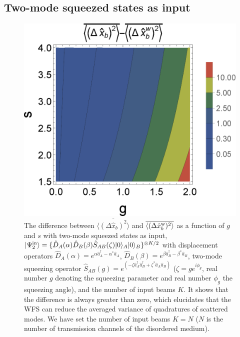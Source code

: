 \documentclass[9pt,twocolumn,twoside]{osajnl}
\begin{document}
\subsection{Two-mode squeezed states as input}

\begin{figure}[htb]
\begin{center}
\includegraphics[width=.40\textwidth]{3Dsqz2_20190708.eps} {}
\end{center}
\caption{The difference between $\overline{\langle (\Delta \hat{x}_b)^2 \rangle}$ and $\overline{\langle (\Delta \hat{x}_b^{\rm{w}})^2 \rangle}$ as a function of $g$ and $s$ with two-mode squeezed states as input, $| \Psi_2^{\rm{in}} \rangle = \{\hat{D}_{A}(\alpha)  \hat{D}_{B}(\beta) \hat{S}_{AB}(\zeta) |0\rangle_A |0\rangle_B \}^{\otimes K/2}$ with displacement operators $\hat{D}_A(\alpha) = e^{\alpha \hat{a}_A^{\dagger} - \alpha^{\ast} \hat{a}_A}$, $\hat{D}_B(\beta) = e^{\beta \hat{a}_B^{\dagger} - \beta^{\ast} \hat{a}_B}$, two-mode squeezing operator $\hat{S}_{AB}(g) = e^{(-\zeta\hat{a}_{A}^{\dagger}\hat{a}_{B}^{\dagger} +\zeta^{\ast} \hat{a}_{A}\hat{a}_{B}) }$ ($\zeta = g e^{i \phi_{g}}$, real number $g$ denoting the squeezing parameter and real number $\phi_{g}$ the squeezing angle), and the number of input beams $K$. It shows that the difference is always greater than zero, which elucidates that the WFS can reduce the averaged variance of quadratures of scattered modes. We have set the number of input beams $K=N$ ($N$ is the number of transmission channels of the disordered medium).}
\label{3dsqz2}
\end{figure}
\end{document}
